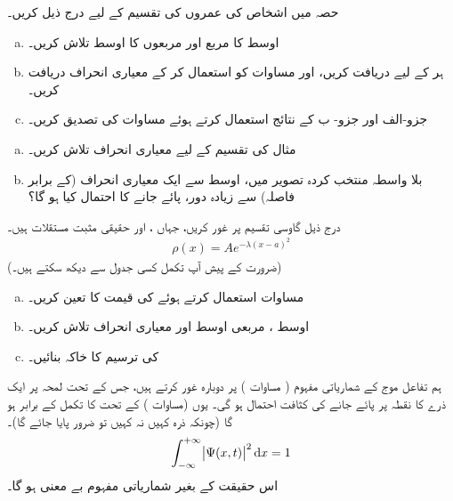  حصہ  میں اشخاص کی عمروں کی تقسیم کے لیے درج ذیل کریں۔ 
\begin{enumerate}[a.]
\item
اوسط کا مربع  اور مربعوں  کا اوسط  تلاش کریں۔ 
\item
 ہر   کے لیے  دریافت کریں،  اور مساوات  کو  استعمال  کر کے  معیاری انحراف دریافت کریں۔
\item
 جزو-الف  اور جزو- ب کے نتائج استعمال کرتے ہوئے مساوات   کی تصدیق کریں۔ 
\end{enumerate}
\begin{enumerate}[a.]
\item
 مثال  کی تقسیم کے لیے معیاری انحراف تلاش کریں۔
\item
بلا واسطہ منتخب کردہ   تصویر میں، اوسط سے  ایک معیاری انحراف  (کے برابر فاصلہ)    سے زیادہ دور،        پائے   جانے کا احتمال کیا ہو گا؟
\end{enumerate}
درج ذیل گاوسی تقسیم پر غور کریں،   جہاں    ،  اور  حقیقی  مثبت  مستقلات  ہیں۔  
\begin{align*}
\rho(x)=Ae^{-\lambda(x-a)^2}
\end{align*}
   (ضرورت کے پیش آپ تکمل کسی جدول سے دیکھ سکتے ہیں۔)
\begin{enumerate}[a.]
\item
مساوات استعمال کرتے ہوئے   کی قیمت کا  تعین کریں۔
\item
اوسط ، مربعی اوسط  اور معیاری انحراف  تلاش کریں۔
\item
{} کی ترسیم کا خاکہ بنائیں۔
\end{enumerate}

ہم تفاعل موج کے شماریاتی مفہوم ( مساوات ) پر دوبارہ غور کرتے ہیں، جس کے تحت لمحہ   پر ایک ذرے کا نقطہ  پر پائے جانے کی کثافت احتمال  ہو گی۔  یوں   (مساوات ) کے تحت  کا تکمل  کے برابر ہو گا (چونکہ ذرہ کہیں نہ کہیں تو ضرور پایا جائے گا)۔ 
\begin{align}\label{مساوات_تفاعل_موج_احتمال_اکائی}
\int_{-\infty}^{+\infty}\abs{\Psi(x,t)}^2\dif x = 1
\end{align}
اس حقیقت کے بغیر شماریاتی مفہوم بے معنی ہو گا۔ 

